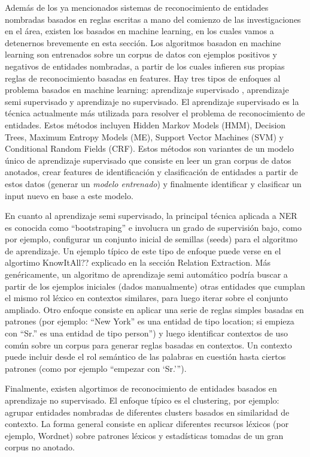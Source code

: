 Además de los ya mencionados sistemas de reconocimiento de entidades nombradas basados en reglas escritas a mano del comienzo de las investigaciones en el área, existen los basados en machine learning, en los cuales vamos a detenernos brevemente en esta sección. Los algoritmos basadon en machine learning son entrenados sobre un corpus de datos con ejemplos positivos y negativos de entidades nombradas, a partir de los cuales infieren sus propias reglas de reconocimiento basadas en features. Hay tres tipos de enfoques al problema basados en machine learning: aprendizaje supervisado , aprendizaje semi supervisado y aprendizaje no supervisado.
El aprendizaje supervisado es la técnica actualmente más utilizada para resolver el problema de reconocimiento de entidades. Estos métodos incluyen Hidden Markov Models (HMM), Decision Trees, Maximum Entropy Models (ME), Support Vector Machines (SVM)  y Conditional Random Fields (CRF). Estos métodos son variantes de un modelo único de aprendizaje supervisado que consiste en leer un gran corpus de datos anotados, crear features de identificación y clasificación de entidades a partir de estos datos (generar un \textit{modelo entrenado}) y finalmente identificar y clasificar un input nuevo en base a este modelo. 

En cuanto al aprendizaje semi supervisado, la principal técnica aplicada a NER es conocida como “bootstraping” e involucra un grado de supervisión bajo, como por ejemplo, configurar un conjunto inicial de semillas (seeds) para el algoritmo de aprendizaje. Un ejemplo típico de este tipo de enfoque puede verse en el algortimo {\color{red} KnowItAll?? explicado en la sección Relation Extraction}. Más genéricamente, un algoritmo de aprendizaje semi automático podría buscar a partir de los ejemplos iniciales (dados manualmente) otras entidades que cumplan el mismo rol léxico en contextos similares, para luego iterar sobre el conjunto ampliado.
Otro enfoque consiste en aplicar una serie de reglas simples basadas en patrones (por ejemplo: “New York” es una entidad de tipo location; si empieza con “Sr.” es una entidad de tipo person”) y luego identificar contextos de uso común sobre un corpus para generar reglas basadas en contextos. Un contexto puede incluir desde el rol semántico de las palabras en cuestión hasta ciertos patrones (como por ejemplo “empezar con ‘Sr.’”).

Finalmente, existen algortimos de reconocimiento de entidades basados en aprendizaje no supervisado. El enfoque típico es el clustering, por ejemplo: agrupar entidades nombradas de diferentes clusters basados en similaridad de contexto.  La forma general consiste en aplicar diferentes recursos léxicos (por ejemplo, Wordnet) sobre patrones léxicos y estadísticas tomadas de un gran corpus no anotado. 

